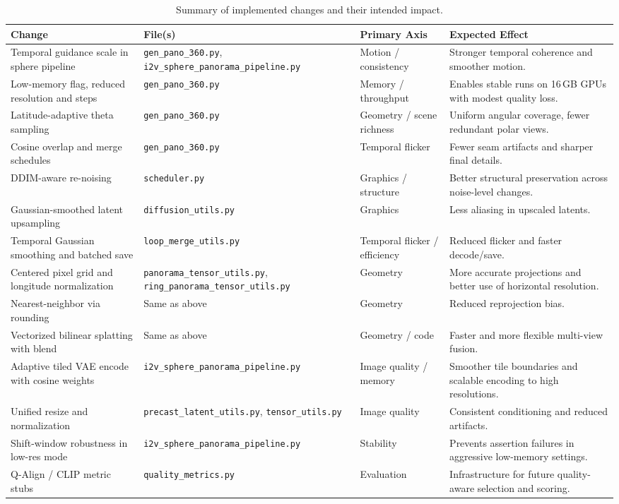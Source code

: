 \documentclass[11pt,a4paper]{article}
\newcommand{\file}[1]{\texttt{#1}}
\begin{document}
\begin{table}[H]
\centering
\footnotesize
\renewcommand{\arraystretch}{1.15}
\begin{tabular}{@{}p{}p{}p{}p{}@{}}
\toprule
\textbf{Change} & \textbf{File(s)} & \textbf{Primary Axis} & \textbf{Expected Effect} \\
\midrule
Temporal guidance scale in sphere pipeline & \file{gen\_pano\_360.py}, \file{i2v\_sphere\_panorama\_pipeline.py} & Motion / consistency & Stronger temporal coherence and smoother motion. \\
Low-memory flag, reduced resolution and steps & \file{gen\_pano\_360.py} & Memory / throughput & Enables stable runs on 16\,GB GPUs with modest quality loss. \\
Latitude-adaptive theta sampling & \file{gen\_pano\_360.py} & Geometry / scene richness & Uniform angular coverage, fewer redundant polar views. \\
Cosine overlap and merge schedules & \file{gen\_pano\_360.py} & Temporal flicker & Fewer seam artifacts and sharper final details. \\
DDIM-aware re-noising & \file{scheduler.py} & Graphics / structure & Better structural preservation across noise-level changes. \\
Gaussian-smoothed latent upsampling & \file{diffusion\_utils.py} & Graphics & Less aliasing in upscaled latents. \\
Temporal Gaussian smoothing and batched save & \file{loop\_merge\_utils.py} & Temporal flicker / efficiency & Reduced flicker and faster decode/save. \\
Centered pixel grid and longitude normalization & \file{panorama\_tensor\_utils.py}, \file{ring\_panorama\_tensor\_utils.py} & Geometry & More accurate projections and better use of horizontal resolution. \\
Nearest-neighbor via rounding & Same as above & Geometry & Reduced reprojection bias. \\
Vectorized bilinear splatting with blend & Same as above & Geometry / code & Faster and more flexible multi-view fusion. \\
Adaptive tiled VAE encode with cosine weights & \file{i2v\_sphere\_panorama\_pipeline.py} & Image quality / memory & Smoother tile boundaries and scalable encoding to high resolutions. \\
Unified resize and normalization & \file{precast\_latent\_utils.py}, \file{tensor\_utils.py} & Image quality & Consistent conditioning and reduced artifacts. \\
Shift-window robustness in low-res mode & \file{i2v\_sphere\_panorama\_pipeline.py} & Stability & Prevents assertion failures in aggressive low-memory settings. \\
Q-Align / CLIP metric stubs & \file{quality\_metrics.py} & Evaluation & Infrastructure for future quality-aware selection and scoring. \\
\bottomrule
\end{tabular}
\caption{Summary of implemented changes and their intended impact.}
\label{tab:summary}
\end{table}
\end{document}

